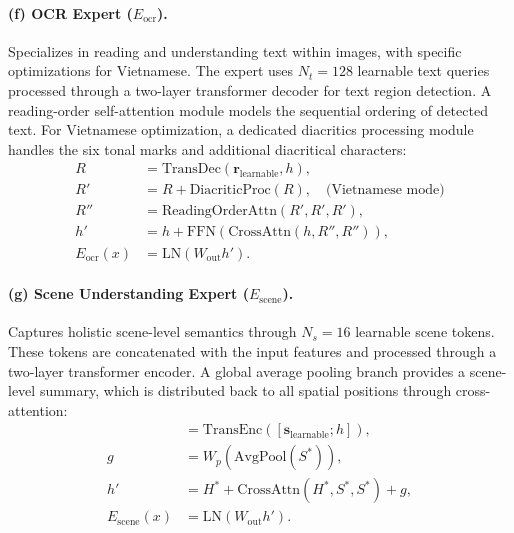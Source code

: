 \paragraph{(f) OCR Expert ($E_{\text{ocr}}$).}
Specializes in reading and understanding text within images, with specific optimizations for Vietnamese. The expert uses $N_t = 128$ learnable text queries processed through a two-layer transformer decoder for text region detection. A reading-order self-attention module models the sequential ordering of detected text. For Vietnamese optimization, a dedicated diacritics processing module handles the six tonal marks and additional diacritical characters:
\begin{align}
    R &= \text{TransDec}(\mathbf{r}_{\text{learnable}}, h), \\
    R' &= R + \text{DiacriticProc}(R), \quad \text{(Vietnamese mode)} \\
    R'' &= \text{ReadingOrderAttn}(R', R', R'), \\
    h' &= h + \text{FFN}\!\left(\text{CrossAttn}(h, R'', R'')\right), \\
    E_{\text{ocr}}(x) &= \text{LN}\!\left(W_{\text{out}} h'\right).
\end{align}

\paragraph{(g) Scene Understanding Expert ($E_{\text{scene}}$).}
Captures holistic scene-level semantics through $N_s = 16$ learnable scene tokens. These tokens are concatenated with the input features and processed through a two-layer transformer encoder. A global average pooling branch provides a scene-level summary, which is distributed back to all spatial positions through cross-attention:
\begin{align}
    [S^*; H^*] &= \text{TransEnc}\!\left([\mathbf{s}_{\text{learnable}}; h]\right), \\
    g &= W_p \left(\text{AvgPool}(S^*)\right), \\
    h' &= H^* + \text{CrossAttn}(H^*, S^*, S^*) + g, \\
    E_{\text{scene}}(x) &= \text{LN}\!\left(W_{\text{out}} h'\right).
\end{align}

